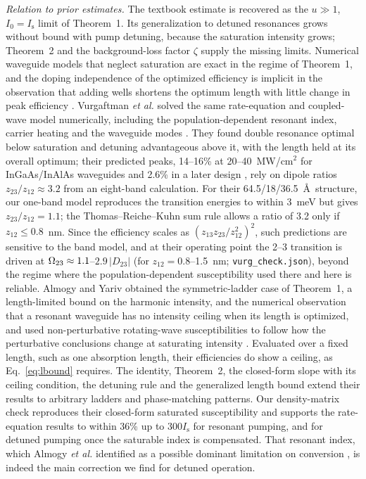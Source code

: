 \documentclass[11pt]{article}
\newcommand{\Is}{I_\mathrm{s}}
\let\hbar\relax\DeclareRobustCommand{\hbar}{{\mathchar'26\mkern-9mu h}}
\begin{document}
\emph{Relation to prior estimates.} The textbook estimate \cite{Vurgaftman2021} is recovered as the $u\gg1$, $I_0=\Is$ limit of Theorem~1. Its generalization to detuned resonances grows without bound with pump detuning, because the saturation intensity grows; Theorem~2 and the background-loss factor $\zeta$ supply the missing limits. Numerical waveguide models that neglect saturation \cite{Chesi2023,DeLeonardis2022} are exact in the regime of Theorem~1, and the doping independence of the optimized efficiency is implicit in the observation that adding wells shortens the optimum length with little change in peak efficiency \cite{Chesi2023}. Vurgaftman \emph{et al.} solved the same rate-equation and coupled-wave model numerically, including the population-dependent resonant index, carrier heating and the waveguide modes \cite{Vurgaftman1996}. They found double resonance optimal below saturation and detuning advantageous above it, with the length held at its overall optimum; their predicted peaks, 14--16\% at 20--40~MW/cm$^2$ for InGaAs/InAlAs waveguides \cite{Vurgaftman1996} and 2.6\% in a later design \cite{VurgaftmanNLO1996}, rely on dipole ratios $z_{23}/z_{12}\approx3.2$ from an eight-band calculation. For their 64.5/18/36.5~\AA\ structure, our one-band model reproduces the transition energies to within 3~meV but gives $z_{23}/z_{12}=1.1$; the Thomas--Reiche--Kuhn sum rule allows a ratio of 3.2 only if $z_{12}\le0.8$~nm. Since the efficiency scales as $(z_{13}z_{23}/z_{12}^2)^2$, such predictions are sensitive to the band model, and at their operating point the 2--3 transition is driven at $\hbar\Omega_{23}\approx1.1$--$2.9\,|D_{23}|$ (for $z_{12}=0.8$--1.5~nm; \texttt{vurg\_check.json}), beyond the regime where the population-dependent susceptibility used there and here is reliable. Almogy and Yariv obtained the symmetric-ladder case of Theorem~1, a length-limited bound on the harmonic intensity, and the numerical observation that a resonant waveguide has no intensity ceiling when its length is optimized, and used non-perturbative rotating-wave susceptibilities to follow how the perturbative conclusions change at saturating intensity \cite{Almogy1994,AlmogyLEOS1994,Almogy1995JNOPM,AlmogyThesis1995}. Evaluated over a fixed length, such as one absorption length, their efficiencies do show a ceiling, as Eq.~\eqref{eq:lbound} requires. The identity, Theorem~2, the closed-form slope with its ceiling condition, the detuning rule and the generalized length bound extend their results to arbitrary ladders and phase-matching patterns. Our density-matrix check reproduces their closed-form saturated susceptibility and supports the rate-equation results to within 36\% up to $300\Is$ for resonant pumping, and for detuned pumping once the saturable index is compensated. That resonant index, which Almogy \emph{et al.} identified as a possible dominant limitation on conversion \cite{AlmogyOL1994PM,AlmogyThesis1995}, is indeed the main correction we find for detuned operation.
\end{document}
